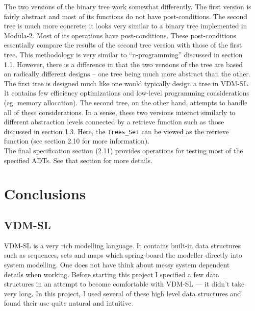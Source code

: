 \documentclass[11pt]{article}
\begin{document}
The two versions of the binary tree work somewhat differently.  The first version is fairly abstract and most of its functions do not have post-conditions.  The second tree is much more concrete; it looks very similar to a binary tree implemented in Modula-2.  Most of its operations have post-conditions.  These post-conditions essentially compare the results of the second tree version with those of the first tree.  This methodology is very similar to ``n-programming''  discussed in section 1.1.  However, there is a difference in that the two versions of the tree are based on radically different designs -- one tree being much more abstract than the other.  The first tree is designed much like one would typically design a tree in VDM-SL.  It contains few efficiency optimizations and low-level programming considerations (eg. memory allocation).  The second tree, on the other hand, attempts to handle all of these considerations.  In a sense, these two versions interact similarly to different abstraction levels connected by a retrieve function such as those discussed in section 1.3.  Here, the {\tt Trees\_Set} can be viewed as the retrieve function (see section 2.10 for more information).\\

The final specification section (2.11) provides operations for testing most of the specified ADTs.  See that section for more details.





\newpage






\newpage
\section{Conclusions}

\subsection{VDM-SL}
VDM-SL is a very rich modelling language.  It contains built-in data structures such as sequences, sets and maps which spring-board the modeller directly into system modelling.  One does not have think about messy system dependent details when working.  Before starting this project I specified a few data structures in an attempt to become comfortable with VDM-SL --- it didn't take very long.  In this project, I used several of these high level data structures and found their use quite natural and intuitive.  \\
\end{document}
